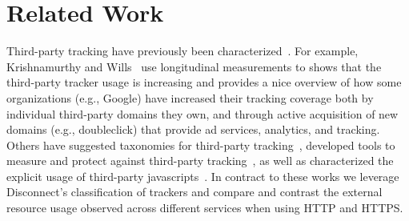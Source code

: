 \documentclass[letterpaper]{sig-alternate-10pt}
\begin{document}
\section{Related Work}\label{sec:related}



Third-party tracking have previously been characterized~\cite{KrWi09,MaMi12,RoKW12}.
For example, Krishnamurthy and Wills~\cite{KrWi09} use longitudinal 
measurements to shows that the third-party tracker usage is increasing
and provides a nice overview of how some organizations (e.g., Google)
have increased their tracking coverage both by individual third-party domains they own,
and through active acquisition of new domains (e.g., doubleclick) 
that provide ad services, analytics, and tracking.
Others have suggested taxonomies for third-party tracking~\cite{RoKW12},
developed tools to measure and protect against third-party tracking~\cite{MaMi12,MPS+13},
as well as characterized the explicit usage of third-party javascripts~\cite{NIK+12}.
In contract to these works we leverage Disconnect's classification 
of trackers and compare and contrast the external resource 
usage observed across different services when using HTTP and HTTPS.

\end{document}
